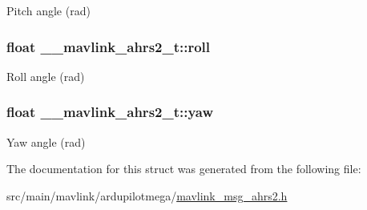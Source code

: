 Pitch angle (rad) 

\hypertarget{struct____mavlink__ahrs2__t_a5e6a3ab1e22639486bf1698b0cfb41df}{
\subsubsection[{roll}]{\setlength{\rightskip}{0pt plus 5cm}float \+\_\+\+\_\+mavlink\+\_\+ahrs2\+\_\+t\+::roll}}\label{struct____mavlink__ahrs2__t_a5e6a3ab1e22639486bf1698b0cfb41df}


Roll angle (rad) 

\hypertarget{struct____mavlink__ahrs2__t_a1bd91fd81102fd424808db6ef4e8aa66}{
\subsubsection[{yaw}]{\setlength{\rightskip}{0pt plus 5cm}float \+\_\+\+\_\+mavlink\+\_\+ahrs2\+\_\+t\+::yaw}}\label{struct____mavlink__ahrs2__t_a1bd91fd81102fd424808db6ef4e8aa66}


Yaw angle (rad) 



The documentation for this struct was generated from the following file\+:\begin{DoxyCompactItemize}
\item 
src/main/mavlink/ardupilotmega/\hyperlink{mavlink__msg__ahrs2_8h}{mavlink\+\_\+msg\+\_\+ahrs2.\+h}\end{DoxyCompactItemize}
